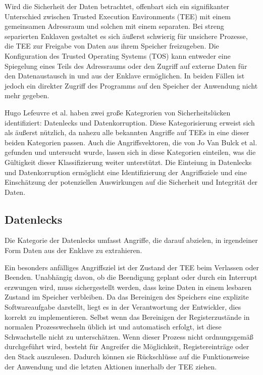 Wird die Sicherheit der Daten betrachtet, offenbart sich ein signifikanter Unterschied zwischen Trusted Execution Environments (TEE) mit einem gemeinsamen Adressraum und solchen mit einem separaten. Bei streng separierten Enklaven gestaltet es sich äußerst schwierig für unsichere Prozesse, die TEE zur Freigabe von Daten aus ihrem Speicher freizugeben. Die Konfiguration des Trusted Operating Systems (TOS) kann entweder eine Spiegelung eines Teils des Adressraums oder den Zugriff auf externe Daten für den Datenaustausch in und aus der Enklave ermöglichen. In beiden Fällen ist jedoch ein direkter Zugriff des Programms auf den Speicher der Anwendung nicht mehr gegeben.

Hugo Lefeuvre et al. haben zwei große Kategrorien von Sicherheitslücken identifiziert: Datenlecks und Datenkorruption. Diese Kategorisierung erweist sich als äußerst nützlich, da nahezu alle bekannten Angriffe auf TEEs in eine dieser beiden Kategorien passen. Auch die Angriffsvektoren, die von Jo Van Bulck et al. gefunden und untersucht wurde, lassen sich in diese Kategorien einteilen, was die Gültigkeit dieser Klassifizierung weiter unterstützt. Die Einteiung in Datenlecks und Datenkorruption ermöglicht eine Identifizierung der Angriffsziele und eine Einschätzung der potenziellen Auswirkungen auf die Sicherheit und Integrität der Daten. \cite{TEEPaper} \cite{CIVPaper}

\subsection{Datenlecks}

Die Kategorie der Datenlecks umfasst Angriffe, die darauf abzielen, in irgendeiner Form Daten aus der Enklave zu extrahieren. 

Ein besonders anfälliges Angriffsziel ist der Zustand der TEE beim Verlassen oder Beenden. Unabhängig davon, ob die Beendigung geplant oder durch ein Interrupt erzwungen wird, muss sichergestellt werden, dass keine Daten in einem lesbaren Zustand im Speicher verbleiben. Da das Bereinigen des Speichers eine explizite Softwareaufgabe darstellt, liegt es in der Verantwortung der Entwickler, dies korrekt zu implementieren. Selbst wenn das Bereinigen der Registerzustände in normalen Prozesswechseln üblich ist und automatisch erfolgt, ist diese Schwachstelle nicht zu unterschätzen. Wenn dieser Prozess nicht ordnungsgemäß durchgeführt wird, besteht für Angreifer die Möglichkeit, Registereinträge oder den Stack auszulesen. Dadurch können sie Rückschlüsse auf die Funktionsweise der Anwendung und die letzten Aktionen innerhalb der TEE ziehen.

